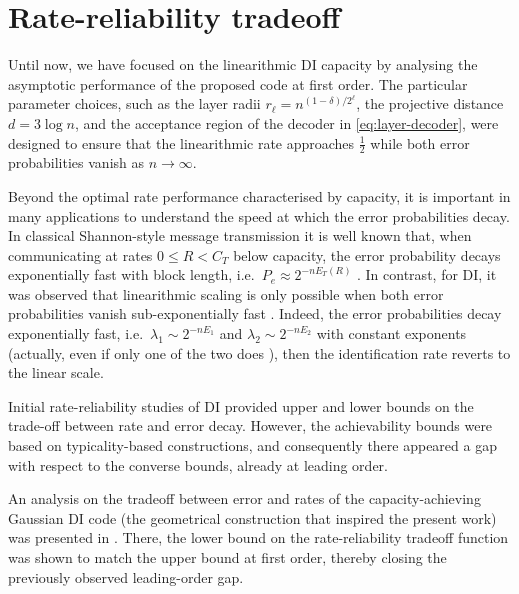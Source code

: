 \documentclass[10pt, conference]{IEEEtran}
\newcommand{\1}{\mathds{1}}
\begin{document}




\section{Rate-reliability tradeoff}\label{sec:RR}
Until now, we have focused on the linearithmic DI capacity by analysing the asymptotic performance of the proposed code at first order. The particular parameter choices, such as the layer radii $r_\ell=n^{(1-\delta)/2^\ell}$, the projective distance $d=3\log n$, and the acceptance region of the decoder in \eqref{eq:layer-decoder}, were designed to ensure that the linearithmic rate approaches $\frac12$ while both error probabilities vanish as $n\to\infty$.

Beyond the optimal rate performance characterised by capacity, it is important in many applications to understand the speed at which the error probabilities decay. In classical Shannon-style message transmission it is well known that, when communicating at rates $0\leq R<C_T$ below capacity, the error probability decays exponentially fast with block length, i.e.\ $P_e\approx 2^{-nE_T(R)}$ \cite{Shannon:TheoryCommunication,Gallager:ReliabilityBook}. In contrast, for DI, it was observed that linearithmic scaling is only possible when both error probabilities vanish sub-exponentially fast \cite{CDBW:Reliability-TCOM,RRGauss-arXiv}. Indeed, the error probabilities decay exponentially fast, i.e.\ $\lambda_1\sim 2^{-nE_1}$ and $\lambda_2\sim 2^{-nE_2}$ with constant exponents (actually, even if only one of the two does \cite{DI-steins}), then the identification rate reverts to the linear scale.

Initial rate-reliability studies of DI \cite{CDBW:Reliability-TCOM,RRGauss-arXiv,DI-steins} provided upper and lower bounds on the trade-off between rate and error decay. However, the achievability bounds were based on typicality-based constructions, and consequently there appeared a gap with respect to the converse bounds, already at leading order.

An analysis on the tradeoff between error and rates of the capacity-achieving Gaussian DI code (the geometrical construction that inspired the present work) was presented in \cite{CDBW:Gauss}. There, the lower bound on the rate-reliability tradeoff function was shown to match the upper bound at first order, thereby closing the previously observed leading-order gap. 
\end{document}
